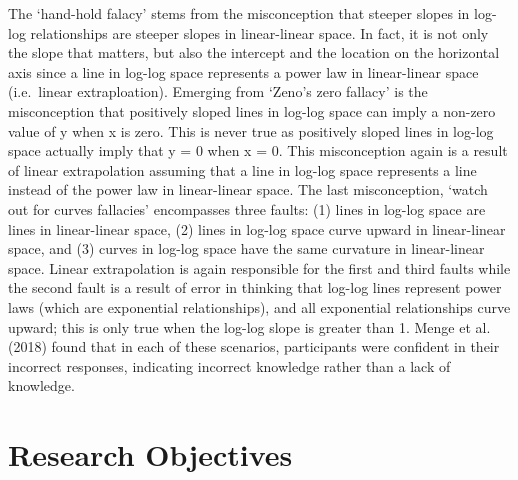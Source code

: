 \documentclass[print]{nuthesis}
\begin{document}
The `hand-hold falacy' stems from the misconception that steeper slopes in log-log relationships are steeper slopes in linear-linear space. In fact, it is not only the slope that matters, but also the intercept and the location on the horizontal axis since a line in log-log space represents a power law in linear-linear space (i.e.~linear extraploation).
Emerging from `Zeno's zero fallacy' is the misconception that positively sloped lines in log-log space can imply a non-zero value of y when x is zero.
This is never true as positively sloped lines in log-log space actually imply that y = 0 when x = 0. This misconception again is a result of linear extrapolation assuming that a line in log-log space represents a line instead of the power law in linear-linear space.
The last misconception, `watch out for curves fallacies' encompasses three faults: (1) lines in log-log space are lines in linear-linear space, (2) lines in log-log space curve upward in linear-linear space, and (3) curves in log-log space have the same curvature in linear-linear space.
Linear extrapolation is again responsible for the first and third faults while the second fault is a result of error in thinking that log-log lines represent power laws (which are exponential relationships), and all exponential relationships curve upward; this is only true when the log-log slope is greater than 1.
Menge et al. (2018) found that in each of these scenarios, participants were confident in their incorrect responses, indicating incorrect knowledge rather than a lack of knowledge.

\hypertarget{research-objectives}{%
\section{Research Objectives}\label{research-objectives}}
\end{document}
